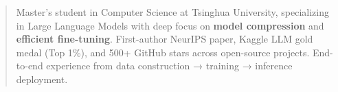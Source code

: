 
\makeheader

\begin{abstract}
Master's student in Computer Science at Tsinghua University, specializing in
Large Language Models with deep focus on \textbf{model compression} and \textbf{efficient fine-tuning}.
First-author NeurIPS paper, Kaggle LLM gold medal (Top 1\%), and 500+ GitHub stars across
open-source projects. End-to-end experience from data construction → training → inference deployment.
\end{abstract}
